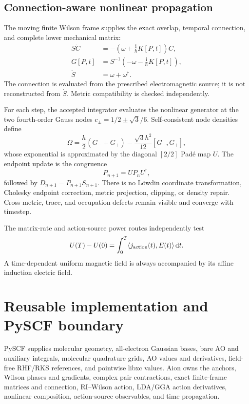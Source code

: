 \documentclass[11pt]{article}
\newcommand{\iu}{\mathrm{i}}
\newcommand{\dd}{\mathrm{d}}
\begin{document}
\subsection{Connection-aware nonlinear propagation}

The moving finite Wilson frame supplies the exact overlap, temporal
connection, and complete lower mechanical matrix:
\begin{align}
 S\dot C&=-\left(\omega+\frac{\iu}{\hbar}K[P,t]\right)C,\\
 G[P,t]&=S^{-1}\left(-\omega-\frac{\iu}{\hbar}K[P,t]\right),\\
 \dot S&=\omega+\omega^\dagger.
\end{align}
The connection is evaluated from the prescribed electromagnetic source; it
is not reconstructed from $\dot S$.  Metric compatibility is checked
independently.

For each step, the accepted integrator evaluates the nonlinear generator at
the two fourth-order Gauss nodes
$c_\pm=1/2\pm\sqrt{3}/6$.  Self-consistent node densities define
\begin{equation}
 \Omega=\frac h2(G_-+G_+)-\frac{\sqrt3h^2}{12}[G_-,G_+],
\end{equation}
whose exponential is approximated by the diagonal $[2/2]$ Pad\'e map $U$.
The endpoint update is the congruence
\begin{equation}
 P_{n+1}=U P_n U^\dagger,
\end{equation}
followed by $D_{n+1}=P_{n+1}S_{n+1}$.  There is no L\"owdin coordinate
transformation, Cholesky endpoint correction, metric projection, clipping,
or density repair.  Cross-metric, trace, and occupation defects remain
visible and converge with timestep.

The matrix-rate and action-source power routes independently test
\begin{equation}
 U(T)-U(0)=\int_0^T\langle j_{\rm action}(t),E(t)\rangle\,\dd t.
\end{equation}
A time-dependent uniform magnetic field is always accompanied by its affine
induction electric field.

\section{Reusable implementation and PySCF boundary}

PySCF supplies molecular geometry, all-electron Gaussian bases, bare AO and
auxiliary integrals, molecular quadrature grids, AO values and derivatives,
field-free RHF/RKS references, and pointwise libxc values.  Aion owns the
anchors, Wilson phases and gradients, complex pair contractions, exact
finite-frame matrices and connection, RI--Wilson action, LDA/GGA action
derivatives, nonlinear composition, action-source observables, and time
propagation.
\end{document}
